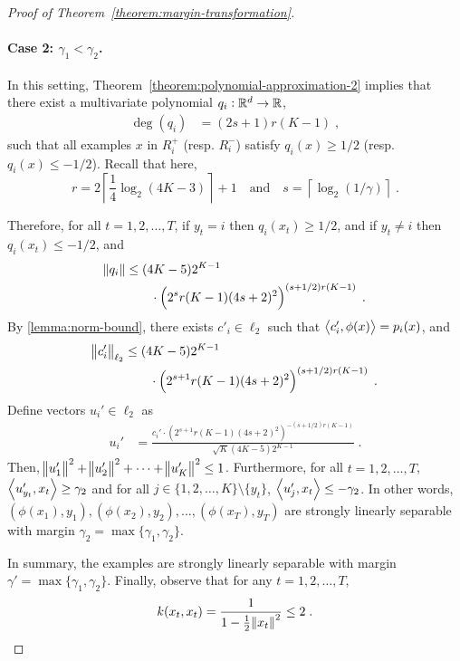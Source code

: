\begin{proof}[Proof of Theorem~\ref{theorem:margin-transformation}]
\paragraph{Case 2: $\gamma_1 < \gamma_2$.} In this setting, Theorem~\ref{theorem:polynomial-approximation-2}
implies that there exist a multivariate polynomial $q_i:\mathbb{R}^d \to \mathbb{R}$,
\begin{align*}
\deg(q_i) & = (2s+1) r(K-1) \; ,
\end{align*}
such that all examples $x$ in $R_i^+$ (resp. $R_i^-$) satisfy $q_i(x) \geq 1/2$
(resp. $q_i(x) \leq -1/2$). Recall that here,
\[
r = 2 \left\lceil \frac{1}{4} \log_2(4K - 3) \right\rceil + 1 \quad \text{and} \quad s = \left \lceil \log_2(1/\gamma) \right \rceil \; .
\]


Therefore, for all $t=1,2,\dots,T$, if $y_t = i$ then $q_i(x_t) \ge 1/2$,
 and if $y_t \neq i$ then $q_i(x_t) \le -1/2$, and
\begin{align*}
  \norm{q_i} & \le (4K-5) 2^{K-1} \\
  & \qquad \cdot \left(2^{s} r(K-1) (4s+2)^2 \right)^{(s+1/2)r(K-1)} \; .
\end{align*}
By \autoref{lemma:norm-bound}, there exists $c'_i \in \ell_2$ such that
$\left\langle c'_i, \phi(x) \right\rangle = p_i(x)$, and
\begin{align*}
  \norm{c'_i}_{\ell_2} & \le (4K-5) 2^{K-1} \\
  & \qquad \cdot \left(2^{s+1} r(K-1) (4s+2)^2 \right)^{(s+1/2)r(K-1)} \; .
\end{align*}
Define vectors $u_i' \in \ell_2$ as
\begin{align*}
u_i' & = \frac{c_i'  \cdot \left(2^{s+1} r(K-1) (4s+2)^2 \right)^{-(s+1/2)r(K-1)}}{\sqrt{K} (4K-5) 2^{K-1}} \; .
\end{align*}
Then,
$\norm{u_1'}^2 + \norm{u_2'}^2 + \dots + \norm{u_K'}^2 \le 1$.
Furthermore, for all $t=1,2,\dots,T$,
$\left\langle u'_{y_t}, x_t \right\rangle \ge \gamma_2$
and for all $j \in \{1,2,\dots,K\} \setminus \{y_t\}$,
$\left\langle u'_j, x_t \right\rangle \le - \gamma_2$. In other words,
$(\phi(x_1), y_1), (\phi(x_2), y_2), \dots, (\phi(x_T), y_T)$ are
strongly linearly separable with margin $\gamma_2 = \max\{\gamma_1, \gamma_2\}$.

In summary, the examples are strongly
linearly separable with margin $\gamma' = \max\{\gamma_1, \gamma_2\}$.
Finally, observe that for any $t=1,2,\dots,T$,
\[
k(x_t,x_t) = \frac{1}{1 - \frac{1}{2} \norm{x_t}^2} \le 2 \; .
\qedhere
\]
\end{proof}
